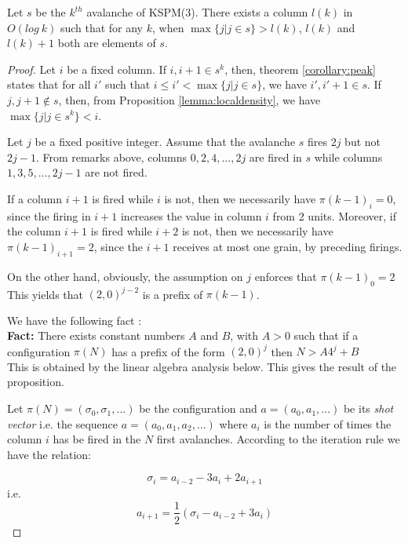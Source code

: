 \documentclass[11pt,a4paper]{llncs}
\begin{document}
\begin{proposition}\label{lemma:meta2}
Let $s$ be the $k^{th}$ avalanche of KSPM(3). There exists a column $l(k)$ in $O(log~ k)$ such that for any $k$, when  $\max\{j \vert j \in s \} > l(k)$, $l(k)$ and $l(k)+1$ both are elements of $s$.
\end{proposition}

\begin{proof}

Let $i$ be a fixed column. If $i,i+1 \in s^k$, then, theorem \ref{corollary:peak} states that for all $i'$ such that $i \leq i' < \max\{j \vert j \in s \}$, we have $i',i'+1 \in s$. If $j,j+1 \notin s$, then, from Proposition \ref{lemma:localdensity},  we have $\max\{j \vert j \in s^k \} < i$.

 Let $j$ be a fixed positive integer. Assume  that  the avalanche $s$ fires $2j $ but not $2j-1$. From remarks above, columns $0, 2, 4,..., 2j$ are fired in $s$ while  columns $1, 3, 5,..., 2j-1$ are not fired. 
 
 
If a column $i+1$ is fired while $i$ is not, then we necessarily have $\pi(k-1)_i = 0$,  since the firing in $i+1$ increases the value in column $i$ from 2 units. 
Moreover, if the  column $i+1$ is fired while $i+2 $ is not, then we necessarily have $\pi(k-1)_{i +1}= 2$, since the $i+1$  receives at most one grain, by preceding firings. 

On the other hand,  obviously, the assumption on $j$ enforces that  $\pi(k-1)_0 = 2$ 
This yields that $(2,0)^{j-2}$ is a prefix  of $\pi(k-1)$. 

We have the following fact : \\ 

\textbf{Fact:} 
There exists constant numbers $A$ and $B$, with $A >0$ such that if a  configuration  $ \pi(N)$ has a prefix of the form $(2,0)^{j}$ then $N > A 4^j + B$\\
 
 This is obtained by  the  linear algebra analysis below. This gives the result of the proposition.  


 Let $ \pi(N)  = (\sigma_0,\sigma_1,\dots)$ be the  configuration and $a=(a_0,a_1,\dots)$ be its 
 {\em shot vector} i.e.   the sequence  $a=(a_0,a_1,a_2,\dots)$ where $a_i$ is the number of times the column  $i$ has be fired in the $N$ first avalanches. According to the iteration rule we have the relation:
 
 $$\sigma_i=a_{i-2}-3a_i+2a_{i+1}$$
 i.e.   $$a_{i+1}=\frac{1}{2}(\sigma_i-a_{i-2}+3a_i)$$


\end{proof}
\end{document}

